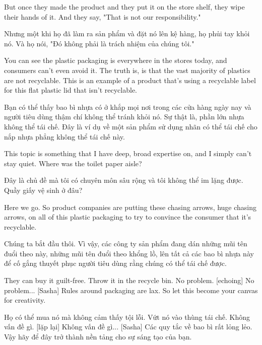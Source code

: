 \documentclass[a4paper]{article}
\begin{document}
	But once they made the product and they put it on the store shelf, they wipe their hands of it.
	And they say, "That is not our responsibility."
	
	\begin{vietnamese-v2}
		Nhưng một khi họ đã làm ra sản phẩm và đặt nó lên kệ hàng, họ phủi tay khỏi nó.
		Và họ nói, "Đó không phải là trách nhiệm của chúng tôi."
	\end{vietnamese-v2}
	
	You can see the plastic packaging is everywhere in the stores today, and consumers can't even avoid it.
	The truth is, is that the vast majority of plastics are not recyclable.
	This is an example of a product that's using a recyclable label for this flat plastic lid that isn't recyclable.
	
	\begin{vietnamese-v2}
		Bạn có thể thấy bao bì nhựa có ở khắp mọi nơi trong các cửa hàng ngày nay và người tiêu dùng thậm chí không thể tránh khỏi nó.
		Sự thật là, phần lớn nhựa không thể tái chế.
		Đây là ví dụ về một sản phẩm sử dụng nhãn có thể tái chế cho nắp nhựa phẳng không thể tái chế này.
	\end{vietnamese-v2}

	This topic is something that I have deep, broad expertise on, and I simply can't stay quiet.
	Where was the toilet paper aisle?
	
	\begin{vietnamese-v2}
		Đây là chủ đề mà tôi có chuyên môn sâu rộng và tôi không thể im lặng được.
		Quầy giấy vệ sinh ở đâu?
	\end{vietnamese-v2}
	
	Here we go.
	So product companies are putting these chasing arrows, huge chasing arrows, on all of this plastic packaging to try to convince the consumer that it's recyclable.
	
	\begin{vietnamese-v2}
		Chúng ta bắt đầu thôi.
		Vì vậy, các công ty sản phẩm đang dán những mũi tên đuổi theo này, những mũi tên đuổi theo khổng lồ, lên tất cả các bao bì nhựa này để cố gắng thuyết phục người tiêu dùng rằng chúng có thể tái chế được.
	\end{vietnamese-v2}
	
	They can buy it guilt-free.
	Throw it in the recycle bin.
	No problem.
	[echoing] No problem...
	[Sasha] Rules around packaging are lax.
	So let this become your canvas for creativity.
	
	\begin{vietnamese-v2}
		Họ có thể mua nó mà không cảm thấy tội lỗi.
		Vứt nó vào thùng tái chế.
		Không vấn đề gì.
		[lặp lại] Không vấn đề gì...
		[Sasha] Các quy tắc về bao bì rất lỏng lẻo.
		Vậy hãy để đây trở thành nền tảng cho sự sáng tạo của bạn.
	\end{vietnamese-v2}
	
\end{document}
